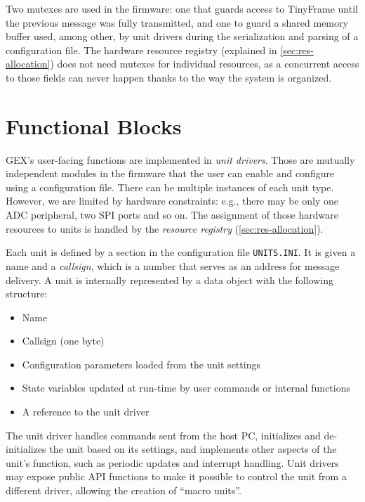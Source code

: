 Two mutexes are used in the firmware: one that guards access to TinyFrame until the previous message was fully transmitted, and one to guard a shared memory buffer used, among other, by unit drivers during the serialization and parsing of a configuration file. The hardware resource registry (explained in \cref{sec:res-allocation}) does not need mutexes for individual resources, as a concurrent access to those fields can never happen thanks to the way the system is organized.

\section{Functional Blocks} \label{sec:units-function}

GEX's user-facing functions are implemented in \textit{unit drivers}. Those are mutually independent modules in the firmware that the user can enable and configure using a configuration file. There can be multiple instances of each unit type. However, we are limited by hardware constraints: e.g., there may be only one \gls{ADC} peripheral, two \gls{SPI} ports and so on. The assignment of those hardware resources to units is handled by the \textit{resource registry} (\cref{sec:res-allocation}).

Each unit is defined by a section in the configuration file \verb|UNITS.INI|. It is given a name and a \textit{callsign}, which is a number that serves as an address for message delivery. A unit is internally represented by a data object with the following structure:

\begin{itemize}
	\item Name
	\item Callsign (one byte)
	\item Configuration parameters loaded from the unit settings
	\item State variables updated at run-time by user commands or internal functions
	\item A reference to the unit driver
\end{itemize}

The unit driver handles commands sent from the host \gls{PC}, initializes and de-initializes the unit based on its settings, and implements other aspects of the unit's function, such as periodic updates and interrupt handling. Unit drivers may expose public \gls{API} functions to make it possible to control the unit from a different driver, allowing the creation of ``macro units''.

